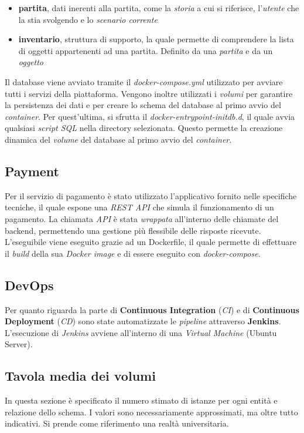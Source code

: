 \documentclass{article}
\begin{document}
\begin{itemize}[label = {-}]
    \item \textbf{partita}, dati inerenti alla partita, come la \textit{storia} a cui si riferisce, l'\textit{utente} che la stia svolgendo e lo \textit{scenario corrente}
    \item \textbf{inventario}, struttura di supporto, la quale permette di comprendere la lista di oggetti appartenenti ad una partita. Definito da una \textit{partita} e da un \textit{oggetto}
\end{itemize}
Il database viene avviato tramite il \textit{docker-compose.yml} utilizzato per avviare tutti i servizi della piattaforma. Vengono inoltre utilizzati i \textit{volumi} per garantire la persistenza dei dati e per creare lo schema del database al primo avvio del \textit{container}. Per quest'ultima, si sfrutta il \textit{docker-entrypoint-initdb.d}, il quale avvia qualsiasi \textit{script SQL} nella directory selezionata. Questo permette la creazione dinamica del \textit{volume} del database al primo avvio del \textit{container}. 

\subsection{Payment}
Per il servizio di pagamento è stato utilizzato l'applicativo fornito nelle specifiche tecniche, il quale espone una \textit{REST API} che simula il funzionamento di un pagamento. La chiamata \textit{API} è stata \textit{wrappata} all'interno delle chiamate del backend, permettendo una gestione più flessibile delle risposte ricevute. L’eseguibile viene eseguito grazie ad un Dockerfile, il quale permette di effettuare il \textit{build} della sua \textit{Docker image} e di essere eseguito con \textit{docker-compose}.

\subsection{DevOps}
Per quanto riguarda la parte di \textbf{Continuous Integration} (\textit{CI}) e di \textbf{Continuous Deployment} (\textit{CD}) sono state automatizzate le \textit{pipeline} attraverso \textbf{Jenkins}. L'esecuzione di \textit{Jenkins} avviene all'interno di una \textit{Virtual Machine} (Ubuntu Server).\vspace*{7pt}\\

\newpage
\subsection{Tavola media dei volumi}
In questa sezione è specificato il numero stimato di istanze per ogni entità e relazione dello schema. I valori sono necessariamente approssimati, ma oltre tutto indicativi. Si prende come riferimento una realtà universitaria.
\end{document}

